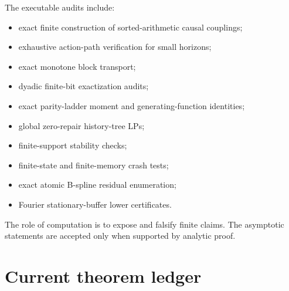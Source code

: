 \documentclass[11pt,a4paper]{article}
\begin{document}
The executable audits include:

\begin{itemize}
\item exact finite construction of sorted-arithmetic causal couplings;
\item exhaustive action-path verification for small horizons;
\item exact monotone block transport;
\item dyadic finite-bit exactization audits;
\item exact parity-ladder moment and generating-function identities;
\item global zero-repair history-tree LPs;
\item finite-support stability checks;
\item finite-state and finite-memory crash tests;
\item exact atomic B-spline residual enumeration;
\item Fourier stationary-buffer lower certificates.
\end{itemize}

The role of computation is to expose and falsify finite claims.  The
asymptotic statements are accepted only when supported by analytic proof.

\section{Current theorem ledger}
\end{document}

